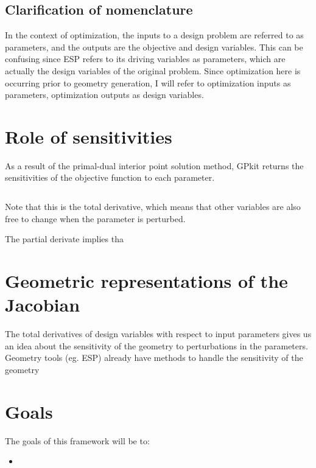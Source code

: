 \documentclass[journal]{new-aiaa}
\begin{document}
\subsection{Clarification of nomenclature}

In the context of optimization, the inputs to a design problem are referred to as parameters,
and the outputs are the objective and design variables.
This can be confusing since ESP refers to its driving variables as parameters,
which are actually the design variables of the original problem.
Since optimization here is occurring prior to geometry generation,
I will refer to optimization inputs as parameters, optimization outputs
as design variables.

\section{Role of sensitivities}

As a result of the primal-dual interior point solution method,
GPkit returns the sensitivities of the objective function to each parameter.

\begin{equation}

\end{equation}

Note that this is the total derivative, which means that other variables are
also free to change when the parameter is perturbed.

The partial derivate implies tha


\section{Geometric representations of the Jacobian}

The total derivatives of design variables with respect to input parameters
gives us an idea about the sensitivity of the geometry to perturbations in the parameters.
Geometry tools (eg. ESP) already have methods to handle the sensitivity of the geometry

\section{Goals}

The goals of this framework will be to:
\begin{itemize}
    \item \textbf{}
\end{itemize}



\end{document}
